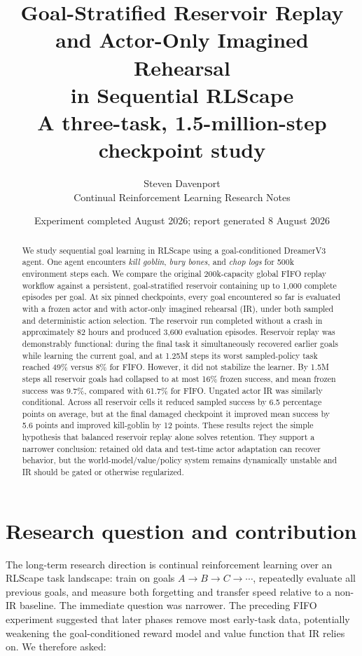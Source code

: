 \documentclass[10pt]{article}
\title{\textbf{Goal-Stratified Reservoir Replay and Actor-Only Imagined Rehearsal\\in Sequential RLScape}\\[3pt]
\large A three-task, 1.5-million-step checkpoint study}
\author{Steven Davenport\\Continual Reinforcement Learning Research Notes}
\date{Experiment completed August 2026; report generated 8 August 2026}
\newcommand{\pct}[1]{#1\%}
\begin{document}
\maketitle

\begin{abstract}
We study sequential goal learning in RLScape using a goal-conditioned DreamerV3 agent. One agent encounters \emph{kill goblin}, \emph{bury bones}, and \emph{chop logs} for 500k environment steps each. We compare the original 200k-capacity global FIFO replay workflow against a persistent, goal-stratified reservoir containing up to 1,000 complete episodes per goal. At six pinned checkpoints, every goal encountered so far is evaluated with a frozen actor and with actor-only imagined rehearsal (IR), under both sampled and deterministic action selection. The reservoir run completed without a crash in approximately 82 hours and produced 3,600 evaluation episodes. Reservoir replay was demonstrably functional: during the final task it simultaneously recovered earlier goals while learning the current goal, and at 1.25M steps its worst sampled-policy task reached \pct{49} versus \pct{8} for FIFO. However, it did not stabilize the learner. By 1.5M steps all reservoir goals had collapsed to at most \pct{16} frozen success, and mean frozen success was \pct{9.7}, compared with \pct{61.7} for FIFO. Ungated actor IR was similarly conditional. Across all reservoir cells it reduced sampled success by 6.5 percentage points on average, but at the final damaged checkpoint it improved mean success by 5.6 points and improved kill-goblin by 12 points. These results reject the simple hypothesis that balanced reservoir replay alone solves retention. They support a narrower conclusion: retained old data and test-time actor adaptation can recover behavior, but the world-model/value/policy system remains dynamically unstable and IR should be gated or otherwise regularized.
\end{abstract}

\section{Research question and contribution}

The long-term research direction is continual reinforcement learning over an RLScape task landscape: train on goals $A\rightarrow B\rightarrow C\rightarrow\cdots$, repeatedly evaluate all previous goals, and measure both forgetting and transfer speed relative to a non-IR baseline. The immediate question was narrower. The preceding FIFO experiment suggested that later phases remove most early-task data, potentially weakening the goal-conditioned reward model and value function that IR relies on. We therefore asked:
\end{document}
